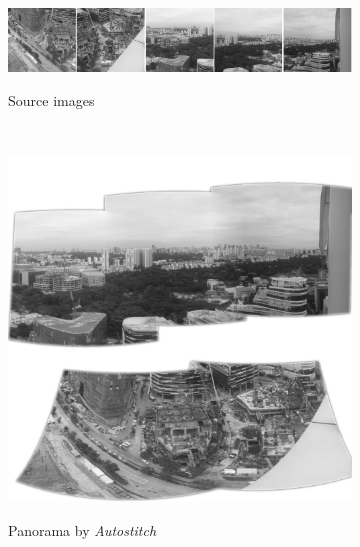\begin{figure}[h]
	\begin{subfigure}[t]{0.9\textwidth}
		\centering
        \includegraphics[width=\textwidth]{images/pano_wide}
        \label{fig:pano_images}
		\caption{Source images}
    \end{subfigure}%
	\\
	\centering
    \begin{subfigure}[b]{0.4\textwidth}
		\includegraphics[width=\textwidth]{images/panorama-autostitch}
        \label{fig:pano_autostitch}
		\caption{Panorama by \emph{Autostitch}}
    \end{subfigure}%
	~%
    \begin{subfigure}[b]{0.4\textwidth}

\end{subfigure}
\end{figure}
